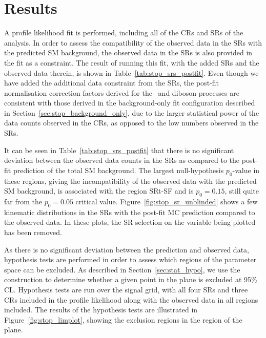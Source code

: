 \section{Results}
\label{sec:stop_results}

A profile likelihood fit is performed, including all of the CRs and SRs of the analysis.
In order to assess the compatibility of the observed data in the SRs with the predicted
SM background, the observed data in the SRs is also provided in the fit as a constraint.
The result of running this fit, with the added SRs and the observed data therein,
is shown in Table~\ref{tab:stop_srs_postfit}.
Even though we have added the additional data constraint from the SRs, the post-fit normalisation
correction factors derived for the \ttbar~and diboson processes are consistent
with those derived in the background-only fit configuration described in Section~\ref{sec:stop_background_only},
due to the larger statistical power of the data counts observed in the CRs, as opposed to the low numbers
observed in the SRs.

It can be seen in Table~\ref{tab:stop_srs_postfit} that there is no significant deviation
between the observed data counts in the SRs as compared to the post-fit prediction of the total SM
background.
The largest null-hypothesis $p_0$-value in these regions, giving the incompatibility of the observed
data with the predicted SM background, is associated with the region SRt-SF and is $p_0 = 0.15$, still
quite far from the $p_0 = 0.05$ critical value.
Figure~\ref{fig:stop_sr_unblinded} shows a few kinematic distributions in the SRs with the post-fit
MC prediction compared to the observed data.
In these plots, the SR selection on the variable being plotted has been removed.

As there is no significant deviation between the prediction and observed data, hypothesis tests are performed in order to assess which regions
of the \bWN parameter space can be excluded.
As described in Section~\ref{sec:stat_hypo}, we use the \cls construction to determine whether
a given point in the \msn plane is excluded at 95\% CL.
Hypothesis tests are run over the \bWN signal grid, with all four SRs and three CRs included in the profile
likelihood along with the observed data in all regions included.
The results of the hypothesis tests are illustrated in Figure~\ref{fig:stop_limplot}, showing the
exclusion regions in the \bWN region of the \msn plane.

